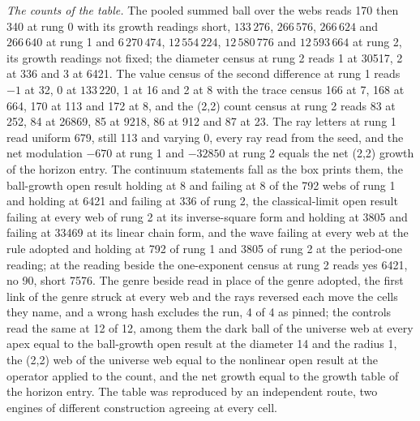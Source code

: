 \begin{chproof}
\textit{The counts of the table.} The pooled summed ball over the webs reads 170 then 340 at rung 0 with its growth readings short, $133\,276$, $266\,576$, $266\,624$ and $266\,640$ at rung 1 and $6\,270\,474$, $12\,554\,224$, $12\,580\,776$ and $12\,593\,664$ at rung 2, its growth readings not fixed; the diameter census at rung 2 reads 1 at 30517, 2 at 336 and 3 at 6421. The value census of the second difference at rung 1 reads $-1$ at 32, 0 at $133\,220$, 1 at 16 and 2 at 8 with the trace census 166 at 7, 168 at 664, 170 at 113 and 172 at 8, and the (2,2) count census at rung 2 reads 83 at 252, 84 at 26869, 85 at 9218, 86 at 912 and 87 at 23. The ray letters at rung 1 read uniform 679, still 113 and varying 0, every ray read from the seed, and the net modulation $-670$ at rung 1 and $-32850$ at rung 2 equals the net (2,2) growth of the horizon entry. The continuum statements fall as the box prints them, the ball-growth open result holding at 8 and failing at 8 of the 792 webs of rung 1 and holding at 6421 and failing at 336 of rung 2, the classical-limit open result failing at every web of rung 2 at its inverse-square form and holding at 3805 and failing at 33469 at its linear chain form, and the wave failing at every web at the rule adopted and holding at 792 of rung 1 and 3805 of rung 2 at the period-one reading; at the reading beside the one-exponent census at rung 2 reads yes 6421, no 90, short 7576. The genre beside read in place of the genre adopted, the first link of the genre struck at every web and the rays reversed each move the cells they name, and a wrong hash excludes the run, 4 of 4 as pinned; the controls read the same at 12 of 12, among them the dark ball of the universe web at every apex equal to the ball-growth open result at the diameter 14 and the radius 1, the (2,2) web of the universe web equal to the nonlinear open result at the operator applied to the count, and the net growth equal to the growth table of the horizon entry. The table was reproduced by an independent route, two engines of different construction agreeing at every cell.
\end{chproof}
